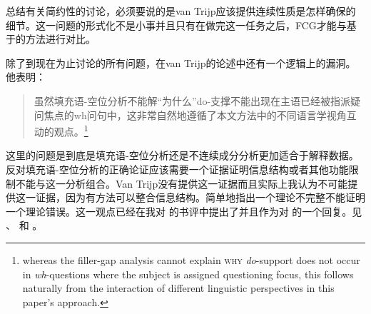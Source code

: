 总结有关简约性的讨论，必须要说的是van Trijp应该提供连续性质是怎样确保的细节。这一问题的形式化不是小事并且只有在做完这一任务之后，FCG才能与基于\slaschc 的方法进行对比。

除了到现在为止讨论的所有问题，在van Trijp的论述中还有一个逻辑上的漏洞。他表明：
\begin{quotation}
虽然填充语-空位分析不能解“为什么”do-支撑不能出现在主语已经被指派疑问焦点的wh问句中，这非常自然地遵循了本文方法中的不同语言学视角互动的观点。\citep[]{vanTrijp2014a}\footnote{%
whereas the filler-gap analysis cannot explain \textsc{why} \emph{do}-support does not occur
  in \emph{wh}-questions where the subject is assigned questioning focus, this follows naturally
from the interaction of different linguistic perspectives in this paper's
approach.}
\end{quotation}
这里的问题是到底是填充语-空位分析还是不连续成分分析更加适合于解释数据。反对填充语-空位分析的正确论证应该需要一个证据证明信息结构或者其他功能限制不能与这一分析组合。Van Trijp没有提供这一证据而且实际上我认为不可能提供这一证据，因为有方法可以整合信息结构。简单地指出一个理论不完整不能证明一个理论错误。这一观点已经在我对 的书评中提出了并且作为对 \citet{Boas2014a}的一个回复。见 、 和 。

